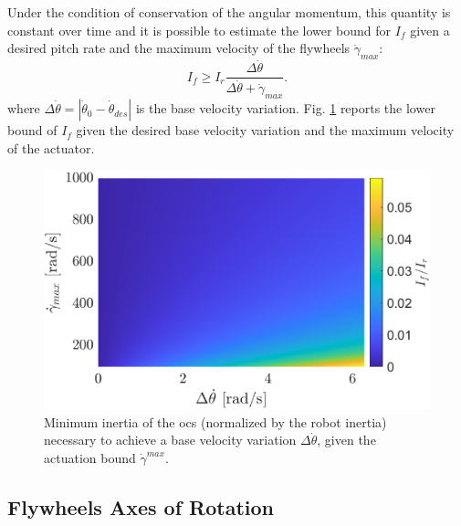 \documentclass[letterpaper, 10 pt, conference]{ieeeconf}      %
\begin{document}
Under the condition of conservation of the angular momentum, this quantity is constant over time and it is possible to estimate the lower bound for $I_{f}$ given a desired pitch rate and the maximum velocity of the flywheels $\dot{\gamma}_{max}$:
\begin{equation}
I_{f} \geq I_r \dfrac{ \Delta \dot{\theta} }{\Delta \dot{\theta}+\dot{\gamma}_{max}}.
\end{equation}
where $\Delta \dot{\theta} =  \left\lvert \dot{\theta}_0-\dot{\theta}_{des} \right\rvert$ is the base velocity variation.
Fig. \ref{fig:inertia_limits} reports the lower bound of $I_{f}$ given the desired base velocity variation and the maximum velocity of the actuator.
\begin{figure}
	\centering
	\includegraphics[width=\linewidth]{figures/lowerbound.eps}
	\caption{\small Minimum inertia of the \gls{ocs} (normalized by the robot inertia) necessary to achieve a base velocity variation $\Delta \dot{\theta}$, given the actuation bound $\dot \gamma^{max}$.}
	\label{fig:inertia_limits}
\end{figure}


\subsection{Flywheels Axes of Rotation}
\end{document}
